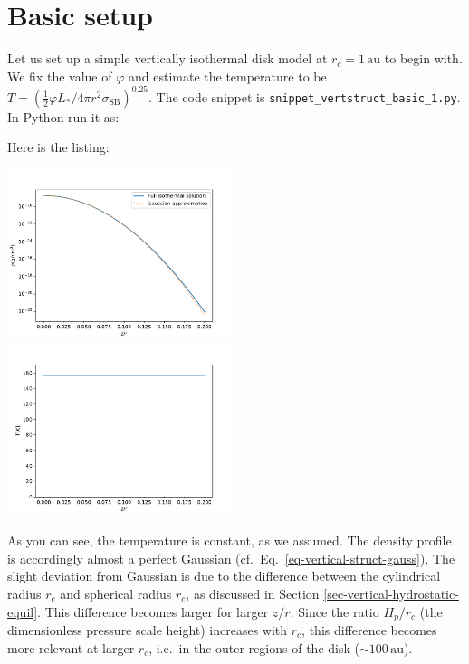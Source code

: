 \documentclass{book}
\newcommand{\code}[1]{{\small\tt #1}}
\begin{document}
\section{Basic setup}\label{sec-vertstruct-basic}
Let us set up a simple vertically isothermal disk model at $r_c=1\,\mathrm{au}$
to begin with. We fix the value of $\varphi$ and estimate the temperature to be
$T=(\tfrac{1}{2}\varphi L_{*}/4\pi r^2\sigma_{\mathrm{SB}})^{0.25}$.  The code
snippet is \code{snippet\_vertstruct\_basic\_1.py}. In Python run it as:
\begin{codebox}
\end{codebox}
Here is the listing: 
\centerline{\includegraphics[width=0.5\textwidth]{../snippets/fig_snippet_vertstruct_basic_1_1.pdf}
  \includegraphics[width=0.5\textwidth]{../snippets/fig_snippet_vertstruct_basic_1_2.pdf}}
As you can see, the temperature is constant, as we assumed. The density profile
is accordingly almost a perfect Gaussian
(cf.~Eq.~\ref{eq-vertical-struct-gauss}). The slight deviation from Gaussian is
due to the difference between the cylindrical radius $r_c$ and spherical radius
$r_c$, as discussed in Section \ref{sec-vertical-hydrostatic-equil}. This difference
becomes larger for larger $z/r$. Since the ratio $H_p/r_c$ (the dimensionless
pressure scale height) increases with $r_c$, this difference becomes more relevant
at larger $r_c$, i.e.\ in the outer regions of the disk ($\sim 100\,\mathrm{au}$). 
\end{document}
